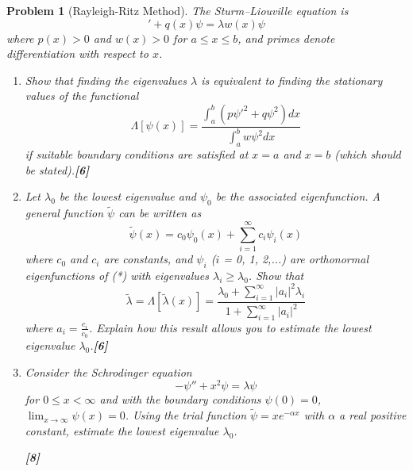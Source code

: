 \documentclass[a4paper]{article}
\theoremstyle{new}
\newtheorem{qns}{Problem}[section]
\begin{document}
\newpage
\begin{qns}[Rayleigh-Ritz Method]
The Sturm–Liouville equation is
\begin{equation}
    [-p(x)\psi']'+q(x)\psi=\lambda w(x)\psi\tag{*}
\end{equation}
where $p(x) > 0$ and $w(x) > 0$ for $a\leq x\leq b$, and primes denote differentiation with respect to $x$.
\begin{enumerate}[label=(\roman*)]
\item Show that finding the eigenvalues $\lambda$ is equivalent to finding the stationary values of the functional
$$\Lambda[\psi(x)]=\frac{\int_a^b(p\psi'^2+q\psi^2)dx}{\int_a^b w\psi^2dx}$$
if suitable boundary conditions are satisfied at $x= a$ and $x = b$ (which should be stated).\hfill \textbf{[6]}
\item Let $\lambda_0$ be the lowest eigenvalue and  $\psi_0$ be the associated eigenfunction. A general function $\tilde{\psi}$ can be written as
$$\tilde{\psi}(x)=c_0\psi_0(x)+\sum_{i=1}^\infty c_i\psi_i(x)$$
where $c_0$ and $c_i$ are constants, and  $\psi_i$ ($i$ = 0, 1, 2,...) are orthonormal eigenfunctions of (*) with eigenvalues $\lambda_i\geq\lambda_0$. Show that
$$\tilde{\lambda}=\Lambda[\tilde{\lambda}(x)]=\frac{\lambda_0+\sum_{i=1}^\infty|a_i|^2\lambda_i}{1+\sum_{i=1}^\infty|a_i|^2}$$
where $a_i=\frac{c_i}{c_0}$. Explain how this result allows you to estimate the lowest eigenvalue $\lambda_0$.\hfill \textbf{[6]}
\item Consider the Schrodinger equation
$$-\psi''+x^2\psi=\lambda\psi$$
for $0\leq x<\infty$ and with the boundary conditions $\psi(0) = 0$, $\lim_{x\rightarrow\infty}\psi(x)=0$. Using the trial function $\tilde{\psi}=xe^{-\alpha x}$ with $\alpha$ a real positive constant, estimate the lowest eigenvalue $\lambda_0$.

\hfill \textbf{[8]}
\end{enumerate}
\end{qns}
\newpage
\end{document}

